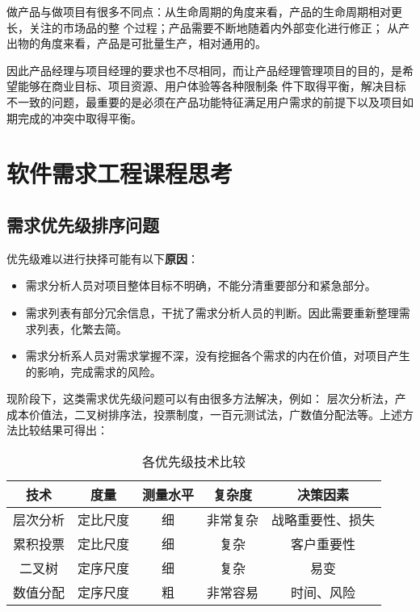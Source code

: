 \documentclass[withoutpreface,bwprint]{cumcmthesis} %
\begin{document}
做产品与做项目有很多不同点：从生命周期的角度来看，产品的生命周期相对更长，关注的市场品的整
个过程；产品需要不断地随着内外部变化进行修正；
从产出物的角度来看，产品是可批量生产，相对通用的。

因此产品经理与项目经理的要求也不尽相同，而让产品经理管理项目的目的，是希望能够在商业目标、项目资源、用户体验等各种限制条
件下取得平衡，解决目标不一致的问题，最重要的是必须在产品功能特征满足用户需求的前提下以及项目如
期完成的冲突中取得平衡。

\section{软件需求工程课程思考}
\subsection{需求优先级排序问题}

优先级难以进行抉择可能有以下\textbf{原因}：
\begin{itemize}
\item 需求分析人员对项目整体目标不明确，不能分清重要部分和紧急部分。
\item 需求列表有部分冗余信息，干扰了需求分析人员的判断。因此需要重新整理需求列表，化繁去简。
\item 需求分析系人员对需求掌握不深，没有挖掘各个需求的内在价值，对项目产生的影响，完成需求的风险。

\end{itemize}

现阶段下，这类需求优先级问题可以有由很多方法解决，例如：
层次分析法，产成本价值法，二叉树排序法，投票制度，一百元测试法，广数值分配法等。上述方法比较结果可得出：

\begin{table}[!htbp]
    \caption{各优先级技术比较}\label{tab:001} \centering
    \begin{tabular}{ccccc}
        \toprule[1.5pt]
        技术 & 度量 & 测量水平 & 复杂度 & 决策因素 \\
        \midrule[1pt]
        层次分析 & 定比尺度 & 细 & 非常复杂 & 战略重要性、损失\\
        累积投票 & 定比尺度 & 细 & 复杂 & 客户重要性\\
        二叉树 & 定序尺度 & 细 & 复杂 &  易变\\
        数值分配 & 定序尺度 & 粗 & 非常容易 & 时间、风险 \\
        \bottomrule[1.5pt]
    \end{tabular}
\end{table}
\end{document}
